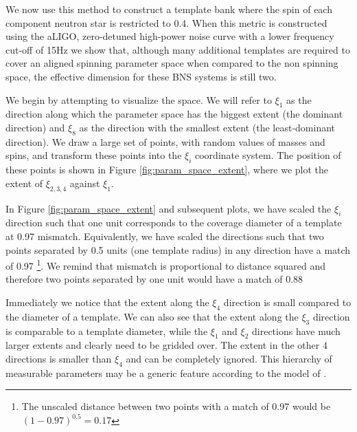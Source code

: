 We now use this method to construct a template bank where the spin of each
component neutron star is restricted to 0.4. When this metric is constructed
using the aLIGO, zero-detuned high-power noise curve with a lower
frequency cut-off of 15Hz we show that, although many additional templates are
required to cover an aligned spinning parameter space when compared to the non
spinning space, the effective dimension for these BNS systems is still two.

We begin by attempting to visualize the space. We will refer to $\xi_1$ as the
direction along which the parameter space has the biggest extent (the dominant
direction) and $\xi_8$ as the direction with the smallest extent (the
least-dominant direction).  We draw a large set of points, with random values
of masses and spins, and transform these points into the $\xi_i$ coordinate
system. The position of these points is shown in Figure
\ref{fig:param_space_extent}, where we plot the extent of $\xi_{2,3,4}$
against $\xi_1$.

In Figure \ref{fig:param_space_extent} and subsequent plots, we have scaled the $\xi_i$
direction such that one unit corresponds to the coverage diameter of a template
at 0.97 mismatch. Equivalently, we have scaled the directions such
that two points separated by 0.5 units (one template radius) in any direction have a match of 0.97%
\footnote{The unscaled distance between two points with a match of 0.97 would be
$(1 - 0.97)^{0.5} = 0.17$}. We remind that mismatch is proportional to distance squared
and therefore two points separated by one unit would have a match of 0.88

Immediately we notice that the extent along the $\xi_4$
direction is small compared to the diameter of a template. We can also see that
the extent along the $\xi_3$ direction is comparable to a template
diameter, while the $\xi_1$ and $\xi_2$ directions have much larger extents
and clearly need to be gridded over. The extent in the other 4 directions is
smaller than $\xi_4$ and can be completely ignored. This hierarchy of measurable 
parameters may be a generic feature according to the model of \cite{Transtrum:2010zz}.

